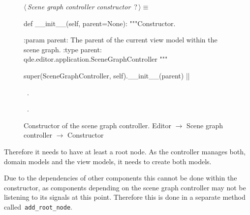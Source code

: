 \documentclass[%
    a4paper,    %
    justified,  %
    nobib,      %
    openany     %
]{tufte-book}
\makeatletter
\renewcommand{\label}[1]{\@tufte@label{##1}}%
\makeatother
\begin{document}
\begin{figure}
\begin{flushleft} \small
\begin{minipage}{\linewidth}\label{scrap26}\raggedright\small
{} $\langle\,${\itshape Scene graph controller constructor}\nobreak\ {\footnotesize {?}}$\,\rangle\equiv$
\vspace{-1ex}
\begin{pythoncode}
def __init__(self, parent=None):
    """Constructor.

    :param parent: The parent of the current view model within
                    the scene graph.
    :type parent:  qde.editor.application.SceneGraphController
    """

    super(SceneGraphController, self).__init__(parent)
|\NWsep|
\end{pythoncode}
\vspace{1.5ex}
\footnotesize
\begin{list}{}{\setlength{\itemsep}{-\parsep}\setlength{\itemindent}{-\leftmargin}}
\item \NWtxtMacroDefBy\ .
\item \NWtxtMacroRefIn\ .

\item{}
\end{list}
\end{minipage}\vspace{4ex}
\end{flushleft}
\caption{Constructor of the scene graph controller.
  \newline{}\newline{}Editor $\rightarrow$ Scene graph controller $\rightarrow$
  Constructor}
\label{editor:lst:scene-graph-controller:constructor}
\end{figure}

 Therefore
it needs to have at least a root node. As the controller manages both, domain
models and the view models, it needs to create both models.

Due to the dependencies of other components this cannot be done within the
constructor, as components depending on the scene graph controller may not be
listening to its signals at this point. Therefore this is done in a separate
method called~\verb=add_root_node=.
\end{document}
